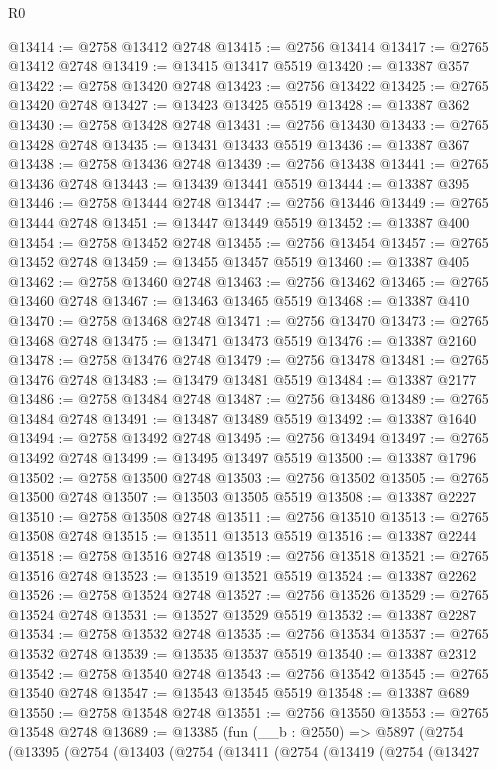 \begin{lexlean}{R0}
\begin{coremodule}
@13414 := @2758 @13412 @2748
@13415 := @2756 @13414
@13417 := @2765 @13412 @2748
@13419 := @13415 @13417 @5519
@13420 := @13387 @357
@13422 := @2758 @13420 @2748
@13423 := @2756 @13422
@13425 := @2765 @13420 @2748
@13427 := @13423 @13425 @5519
@13428 := @13387 @362
@13430 := @2758 @13428 @2748
@13431 := @2756 @13430
@13433 := @2765 @13428 @2748
@13435 := @13431 @13433 @5519
@13436 := @13387 @367
@13438 := @2758 @13436 @2748
@13439 := @2756 @13438
@13441 := @2765 @13436 @2748
@13443 := @13439 @13441 @5519
@13444 := @13387 @395
@13446 := @2758 @13444 @2748
@13447 := @2756 @13446
@13449 := @2765 @13444 @2748
@13451 := @13447 @13449 @5519
@13452 := @13387 @400
@13454 := @2758 @13452 @2748
@13455 := @2756 @13454
@13457 := @2765 @13452 @2748
@13459 := @13455 @13457 @5519
@13460 := @13387 @405
@13462 := @2758 @13460 @2748
@13463 := @2756 @13462
@13465 := @2765 @13460 @2748
@13467 := @13463 @13465 @5519
@13468 := @13387 @410
@13470 := @2758 @13468 @2748
@13471 := @2756 @13470
@13473 := @2765 @13468 @2748
@13475 := @13471 @13473 @5519
@13476 := @13387 @2160
@13478 := @2758 @13476 @2748
@13479 := @2756 @13478
@13481 := @2765 @13476 @2748
@13483 := @13479 @13481 @5519
@13484 := @13387 @2177
@13486 := @2758 @13484 @2748
@13487 := @2756 @13486
@13489 := @2765 @13484 @2748
@13491 := @13487 @13489 @5519
@13492 := @13387 @1640
@13494 := @2758 @13492 @2748
@13495 := @2756 @13494
@13497 := @2765 @13492 @2748
@13499 := @13495 @13497 @5519
@13500 := @13387 @1796
@13502 := @2758 @13500 @2748
@13503 := @2756 @13502
@13505 := @2765 @13500 @2748
@13507 := @13503 @13505 @5519
@13508 := @13387 @2227
@13510 := @2758 @13508 @2748
@13511 := @2756 @13510
@13513 := @2765 @13508 @2748
@13515 := @13511 @13513 @5519
@13516 := @13387 @2244
@13518 := @2758 @13516 @2748
@13519 := @2756 @13518
@13521 := @2765 @13516 @2748
@13523 := @13519 @13521 @5519
@13524 := @13387 @2262
@13526 := @2758 @13524 @2748
@13527 := @2756 @13526
@13529 := @2765 @13524 @2748
@13531 := @13527 @13529 @5519
@13532 := @13387 @2287
@13534 := @2758 @13532 @2748
@13535 := @2756 @13534
@13537 := @2765 @13532 @2748
@13539 := @13535 @13537 @5519
@13540 := @13387 @2312
@13542 := @2758 @13540 @2748
@13543 := @2756 @13542
@13545 := @2765 @13540 @2748
@13547 := @13543 @13545 @5519
@13548 := @13387 @689
@13550 := @2758 @13548 @2748
@13551 := @2756 @13550
@13553 := @2765 @13548 @2748
@13689 := @13385
    (fun (__b : @2550) =>
    @5897
      (@2754
        (@13395
          (@2754
            (@13403
              (@2754
                (@13411
                  (@2754
                    (@13419
                      (@2754
                        (@13427

\end{coremodule}
\end{lexlean}
